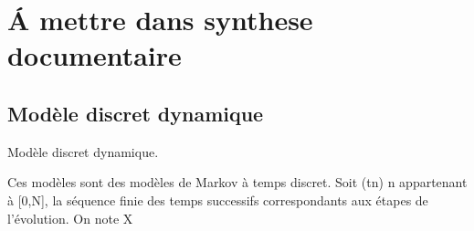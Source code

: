 \section{\'A mettre dans synthese documentaire}
\subsection{Modèle discret dynamique}
Modèle discret dynamique.

Ces modèles sont des modèles de Markov à temps discret. Soit (tn) n appartenant à [0,N], la séquence finie des temps successifs correspondants aux étapes de l’évolution. On note X
